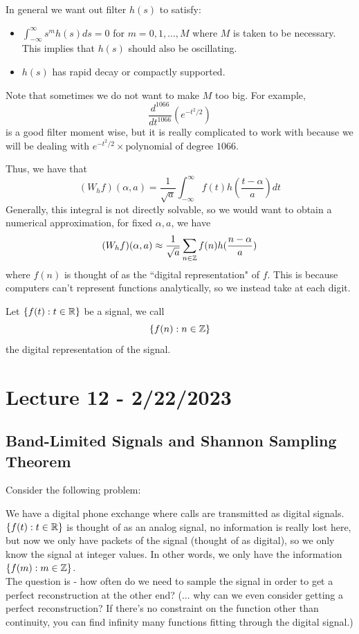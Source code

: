 \documentclass{article}
\begin{document}
In general we want out filter $h(s)$ to satisfy:
\begin{itemize}
    \item $\int_{-\infty}^\infty s^m h(s) ds = 0$ for $m = 0, 1, ..., M$ where $M$ is taken to be necessary. This implies that $h(s)$ should also be oscillating.
    \item $h(s)$ has rapid decay or compactly supported.
\end{itemize}

Note that sometimes we do not want to make $M$ too big. For example,
\[\frac{d^{1066}}{d t^{1066}} (e^{-t^2/2})\]
is a good filter moment wise, but it is really complicated to work with because we will be dealing with $e^{-t^2/2} \times \text{polynomial of degree $1066$}$.

Thus, we have that
\[(W_h f)(\alpha, a) = \frac{1}{\sqrt{a}} \int_{-\infty}^\infty f(t) h(\frac{t - \alpha}{a}) dt\]
Generally, this integral is not directly solvable, so we would want to obtain a numerical approximation, for fixed $\alpha, a$, we have
\[(W_h f)(\alpha, a) \approx \frac{1}{\sqrt{a}} \sum_{n \in \mathbb{Z}} f(n) h(\frac{n - \alpha}{a})\]
where $f(n)$ is thought of as the ``digital representation" of $f$. This is because computers can't represent functions analytically, so we instead take at each digit.

\begin{definition}
    Let $\{f(t): t \in \mathbb{R}\}$ be a signal, we call
    \[\{f(n): n \in \mathbb{Z}\}\]
    the digital representation of the signal.
\end{definition}

\newpage

\section{Lecture 12 - 2/22/2023}

\subsection{Band-Limited Signals and Shannon Sampling Theorem}

Consider the following problem:

\begin{question}
We have a digital phone exchange where calls are transmitted as digital signals. $\{f(t): t \in \mathbb{R}\}$ is thought of as an analog signal, no information is really lost here, but now we only have packets of the signal (thought of as digital), so we only know the signal at integer values. In other words, we only have the information $\{f(m): m \in \mathbb{Z}\}$.\\

The question is - how often do we need to sample the signal in order to get a perfect reconstruction at the other end? (... why can we even consider getting a perfect reconstruction? If there's no constraint on the function other than continuity, you can find infinity many functions fitting through the digital signal.) 
\end{question}
\end{document}
